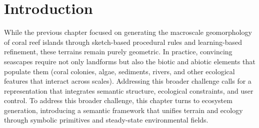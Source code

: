 
\section{Introduction}
While the previous chapter focused on generating the macroscale geomorphology of coral reef islands through sketch-based procedural rules and learning-based refinement, these terrains remain purely geometric. In practice, convincing seascapes require not only landforms but also the biotic and abiotic elements that populate them (coral colonies, algae, sediments, rivers, and other ecological features that interact across scales). Addressing this broader challenge calls for a representation that integrates semantic structure, ecological constraints, and user control. To address this broader challenge, this chapter turns to ecosystem generation, introducing a semantic framework that unifies terrain and ecology through symbolic primitives and steady-state environmental fields.


